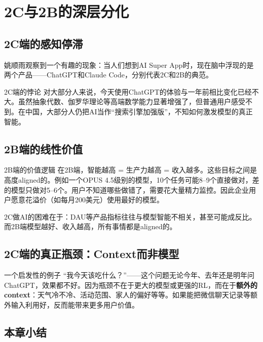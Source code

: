 \documentclass[a4paper]{article}
\begin{document}
\section{2C与2B的深层分化}

\subsection{2C端的感知停滞}

姚顺雨观察到一个有趣的现象：当人们想到AI Super App时，现在脑中浮现的是两个产品——ChatGPT和Claude Code，分别代表2C和2B的典范。

\begin{warningbox}{2C端的悖论}
对大部分人来说，今天使用ChatGPT的体验与一年前相比变化已经不大。虽然抽象代数、伽罗华理论等高端数学能力显著增强了，但普通用户感受不到。在中国，大部分人仍把AI当作``搜索引擎加强版''，不知如何激发模型的真正智能。
\end{warningbox}

\subsection{2B端的线性价值}

\begin{importantbox}{2B端的价值逻辑}
在2B端，智能越高 = 生产力越高 = 收入越多。这些目标之间是高度aligned的。例如一个OPUS 4.5级别的模型，10个任务可能8--9个直接做对，差的模型只做对5--6个。用户不知道哪些做错了，需要花大量精力监控。因此企业用户愿意花溢价（如每月200美元）使用最好的模型。
\end{importantbox}

2C做AI的困难在于：DAU等产品指标往往与模型智能不相关，甚至可能成反比。而2B端模型越好、收入越高，所有事情都是aligned的。

\subsection{2C端的真正瓶颈：Context而非模型}

\begin{knowledgebox}{一个启发性的例子}
``我今天该吃什么？''——这个问题无论今年、去年还是明年问ChatGPT，效果都不好。因为瓶颈不在于更大的模型或更强的RL，而在于\textbf{额外的context}：天气冷不冷、活动范围、家人的偏好等等。如果能把微信聊天记录等额外输入利用好，反而能带来更多用户价值。
\end{knowledgebox}

\subsection{本章小结}
\end{document}
